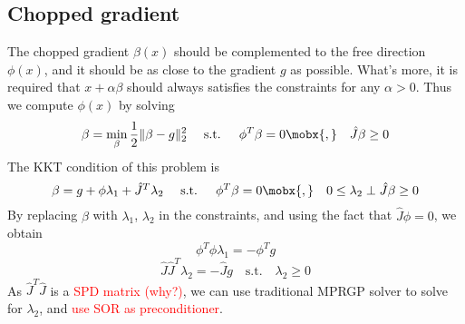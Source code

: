 \documentclass[9pt,twocolumn]{extarticle}
\newcommand{\TODO}[1]{\textcolor{red}{#1}}
\begin{document}
\subsection{Chopped gradient}
The chopped gradient $\beta(x)$ should be complemented to the free direction $\phi(x)$, and it should be as close to the gradient $g$ as possible. What's more, it is required that $x+\alpha \beta$ should always satisfies the constraints for any $\alpha > 0$. Thus we compute $\phi(x)$ by solving
\begin{equation}
  \beta = \min_\beta \frac{1}{2} \|\beta - g\|_2^2  \quad \mbox{ s.t. } \quad \phi^T \beta = 0 \mobx{, }\quad \hat{J} \beta \ge 0
\end{equation}
The KKT condition of this problem is
\begin{equation}
  \beta = g + \phi \lambda_1 + \hat{J}^T\lambda_2  \quad \mbox{ s.t. } \quad \phi^T \beta = 0 \mobx{, }\quad 0 \le \lambda_2 \perp \hat{J} \beta \ge 0
\end{equation}
By replacing $\beta$ with $\lambda_1$, $\lambda_2$ in the constraints, and using the fact that $\hat{J}\phi = 0$, we obtain
\begin{equation}
  \phi^T\phi \lambda_1 = -\phi^Tg
\end{equation}
\begin{equation}
  \hat{J}\hat{J}^T\lambda_2 = -\hat{J}g \quad \mbox{s.t.} \quad \lambda_2 \ge 0
\end{equation}
As $\hat{J}^T\hat{J}$ is a \TODO{SPD matrix (why?)}, we can use traditional MPRGP solver to solve for $\lambda_2$, and \TODO{use SOR as preconditioner}.

\end{document}
